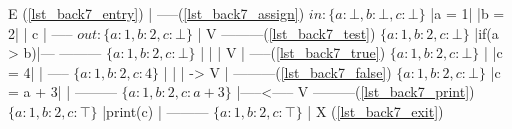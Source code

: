 \begin{minipage}[t]{3in}\label{lst_back7_entry}%
\label{lst_back7_assign}%
\label{lst_back7_test}%
\label{lst_back7_true}%
\label{lst_back7_false}%
\label{lst_back7_print}%
\label{lst_back7_exit}
\begin{AVerb}
     E (\ref{lst_back7_entry})
     |
   -----(\ref{lst_back7_assign}) $\mathit{in:} \{a : \bot,b : \bot,c : \bot\}$
  |a = 1|
  |b = 2|
  |  c  |
   -----    $\mathit{out:} \{a : 1,b : 2,c : \bot\}$
     |
     V
 ---------(\ref{lst_back7_test}) $\{a : 1,b : 2,c : \bot\}$
|if(a > b)|---
 ---------    $\{a : 1,b : 2,c : \bot\}$
     |        |
     |        V
     |      -----(\ref{lst_back7_true}) $\{a : 1,b : 2,c : \bot\}$
     |     |c = 4|
     |      -----    $\{a : 1,b : 2,c : 4\}$
     |        |
     |         ->
     V           |
 ---------(\ref{lst_back7_false}) $\{a : 1,b : 2,c : \bot\}$
|c = a + 3|      |
 ---------    $\{a : 1,b : 2,c : a + 3\}$
     |-----<-----
     V
 ---------(\ref{lst_back7_print}) $\{a : 1,b : 2,c : \top\}$
|print(c) |
 ---------    $\{a : 1,b : 2,c : \top\}$
     |
     X (\ref{lst_back7_exit})
\end{AVerb}
\end{minipage}





